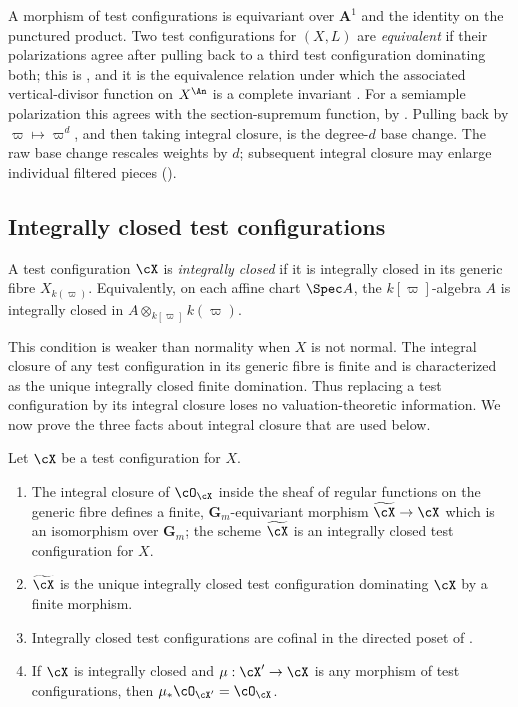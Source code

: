 A morphism of test configurations is equivariant over $\mathbf A^1$ and
the identity on the punctured product.  Two test configurations for
$(X,L)$ are \emph{equivalent} if their polarizations agree after pulling
back to a third test configuration dominating both; this is
\cite[Definition~6.1]{BHJ17}, and it is the equivalence relation under
which the associated vertical-divisor function on $X^{\An}$ is a
complete invariant \cite[Theorem~2.31(i)]{BJ22}.  For a semiample
polarization this agrees with the section-supremum function, by
.  Pulling back by
$\varpi\mapsto\varpi^d$, and then taking integral closure, is the
degree-$d$ base change.  The raw base change rescales weights by $d$;
subsequent integral closure may enlarge individual filtered pieces
().

\subsection{Integrally closed test configurations}
\label{sec:ch33-integral-closure}

\begin{definition}
\label{def:integrally-closed-tc}
A test configuration $\cX$ is \emph{integrally closed} if it is integrally
closed in its generic fibre $X_{k(\varpi)}$.  Equivalently, on each affine
chart $\Spec A$, the $k[\varpi]$-algebra $A$ is integrally closed in
$A\otimes_{k[\varpi]}k(\varpi)$.
\end{definition}

This condition is weaker than normality when $X$ is not normal.  The
integral closure of any test configuration in its generic fibre is finite
and is characterized as the unique integrally closed finite domination.
Thus replacing a test configuration by its integral closure loses no
valuation-theoretic information.  We now prove the three facts about
integral closure that are used below.

\begin{proposition}\label{prop:ch33-integral-closure-exists}
Let $\cX$ be a test configuration for $X$.
\begin{enumerate}
\item The integral closure of $\cO_{\cX}$ inside the sheaf of regular
 functions on the generic fibre defines a finite,
 $\mathbf G_m$-equivariant morphism
 $\widetilde\cX\to\cX$ which is an isomorphism over
 $\mathbf G_m$; the scheme $\widetilde\cX$ is an integrally closed test
 configuration for $X$.
\item $\widetilde\cX$ is the unique integrally closed test configuration
 dominating $\cX$ by a finite morphism.
\item Integrally closed test configurations are cofinal in the directed
 poset of .
\item If $\cX$ is integrally closed and $\mu:\cX'\to\cX$ is any
 morphism of test configurations, then $\mu_\ast\cO_{\cX'}=\cO_{\cX}$.
\end{enumerate}
\end{proposition}


